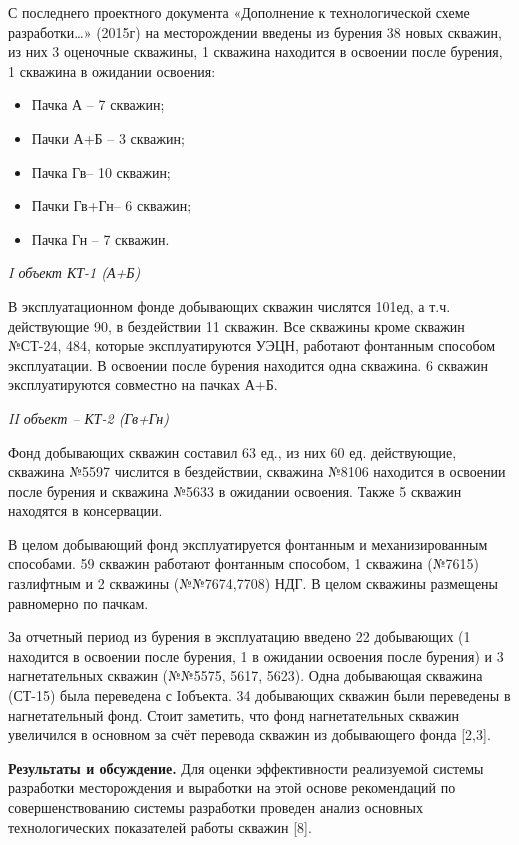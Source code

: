 С последнего проектного документа «Дополнение к технологической схеме
разработки\ldots» (2015г) на месторождении введены из бурения 38 новых
скважин, из них 3 оценочные скважины, 1 скважина находится в освоении
после бурения, 1 скважина в ожидании освоения:

\begin{itemize}
\item
  Пачка А -- 7 скважин;
\item
  Пачки А+Б -- 3 скважин;
\item
  Пачка Гв-- 10 скважин;
\item
  Пачки Гв+Гн-- 6 скважин;
\item
  Пачка Гн -- 7 скважин.
\end{itemize}

\emph{I объект КТ-1 (А+Б)}

В эксплуатационном фонде добывающих скважин числятся 101ед, а т.ч.
действующие 90, в бездействии 11 скважин. Все скважины кроме скважин
№СТ-24, 484, которые эксплуатируются УЭЦН, работают фонтанным способом
эксплуатации. В освоении после бурения находится одна скважина. 6
скважин эксплуатируются совместно на пачках А+Б.

\emph{II объект -- КТ-2 (Гв+Гн)}

Фонд добывающих скважин составил 63 ед., из них 60 ед. действующие,
скважина №5597 числится в бездействии, скважина №8106 находится в
освоении после бурения и скважина №5633 в ожидании освоения. Также 5
скважин находятся в консервации.

В целом добывающий фонд эксплуатируется фонтанным и механизированным
способами. 59 скважин работают фонтанным способом, 1 скважина (№7615)
газлифтным и 2 скважины (№№7674,7708) НДГ. В целом скважины размещены
равномерно по пачкам.

За отчетный период из бурения в эксплуатацию введено 22 добывающих (1
находится в освоении после бурения, 1 в ожидании освоения после бурения)
и 3 нагнетательных скважин (№№5575, 5617, 5623). Одна добывающая
скважина (СТ-15) была переведена с Iобъекта. 34 добывающих скважин были
переведены в нагнетательный фонд. Стоит заметить, что фонд
нагнетательных скважин увеличился в основном за счёт перевода скважин из
добывающего фонда {[}2,3{]}.

{\bfseries Результаты и обсуждение.} Для оценки эффективности реализуемой
системы разработки месторождения и выработки на этой основе рекомендаций
по совершенствованию системы разработки проведен анализ основных
технологических показателей работы скважин {[}8{]}.

